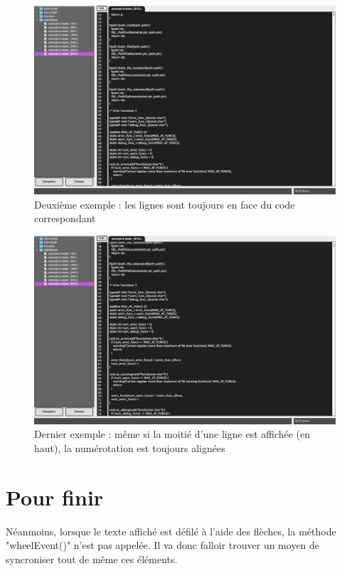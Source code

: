 \documentclass[a4paper,12pt]{article}
\begin{document}
		\begin{figure}[h!]
			\begin{center}
				\includegraphics[scale=0.2]{images/l2}
				\caption{Deuxième exemple : les lignes sont toujours en face du code correspondant}
			\end{center}
		\end{figure}
	
		\begin{figure}[h!]
			\begin{center}
				\includegraphics[scale=0.2]{images/l3}
				\caption{Dernier exemple : même si la moitié d'une ligne est affichée (en haut), la numérotation est toujours alignées}
			\end{center}
		\end{figure}
		
\newpage
		
\section{Pour finir}

	Néanmoins, lorsque le texte affiché est défilé à l'aide des flèches, la méthode "wheelEvent()" n'est pas appelée. Il va donc falloir trouver un moyen de syncroniser tout de même ces éléments.
		
		
		
\end{document}
